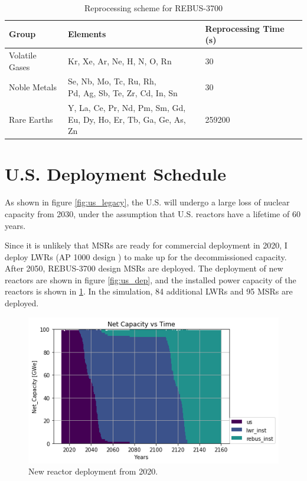 \begin{table}[h]
	\centering
	\caption{Reprocessing scheme for REBUS-3700}
	\label{tab:rebus_reproc}
	\begin{tabular}{lll}
		\hline
		Group & Elements & Reprocessing Time (s) \\
		\hline    
		Volatile Gases & Kr, Xe, Ar, Ne, H, N, O, Rn & 30 \\
		Noble Metals & \shortstack{Se, Nb, Mo, Tc, Ru, Rh,\\ Pd, Ag, Sb, Te, Zr, Cd, In, Sn} & 30 \\
		Rare Earths & \shortstack{Y, La, Ce, Pr, Nd, Pm, Sm, Gd, \\ Eu, Dy, Ho, Er, Tb, Ga, Ge, As, Zn} & 259200 \\
		\hline
	\end{tabular}
\end{table}



\section{U.S. Deployment Schedule}

As shown in figure \ref{fig:us_legacy}, the U.S. will
undergo a large loss of nuclear capacity from 2030, under the
assumption that U.S. reactors have a lifetime of 60 years.

Since it is unlikely that \glspl{MSR} are ready for
commercial deployment in 2020, I deploy \glspl{LWR} (AP 1000 design \cite{sutharshan_ap1000tm_2011})
to make up for the decommissioned capacity. After 2050,
REBUS-3700 design \glspl{MSR} are deployed. The deployment of new reactors
are shown in figure \ref{fig:us_dep}, and the installed
power capacity of the reactors is shown in \ref{fig:us_pow}.
In the simulation, 84 additional \glspl{LWR} and 95 \glspl{MSR}
are deployed.

\begin{figure}[htbp!]
	\begin{center}
		\includegraphics[scale=0.6]{./images/us/power_plot.png}
	\end{center}
	\caption{New reactor deployment from 2020.}
	\label{fig:us_pow}
\end{figure}

